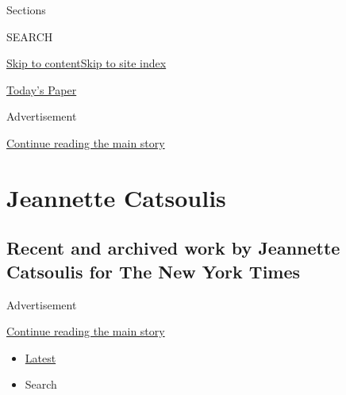 Sections

SEARCH

\protect\hyperlink{site-content}{Skip to
content}\protect\hyperlink{site-index}{Skip to site index}

\href{https://myaccount.nytimes.com/auth/login?response_type=cookie\&client_id=vi}{}

\href{https://www.nytimes.com/section/todayspaper}{Today's Paper}

Advertisement

\protect\hyperlink{after-top}{Continue reading the main story}

\hypertarget{jeannette-catsoulis}{%
\section{Jeannette Catsoulis}\label{jeannette-catsoulis}}

\hypertarget{recent-and-archived-work-by-jeannette-catsoulis-for-the-new-york-times}{%
\subsection{Recent and archived work by Jeannette Catsoulis for The New
York
Times}\label{recent-and-archived-work-by-jeannette-catsoulis-for-the-new-york-times}}

Advertisement

\protect\hyperlink{after-mid1}{Continue reading the main story}

\begin{itemize}
\tightlist
\item
  \protect\hyperlink{stream-panel}{Latest}
\item
  Search
\end{itemize}

